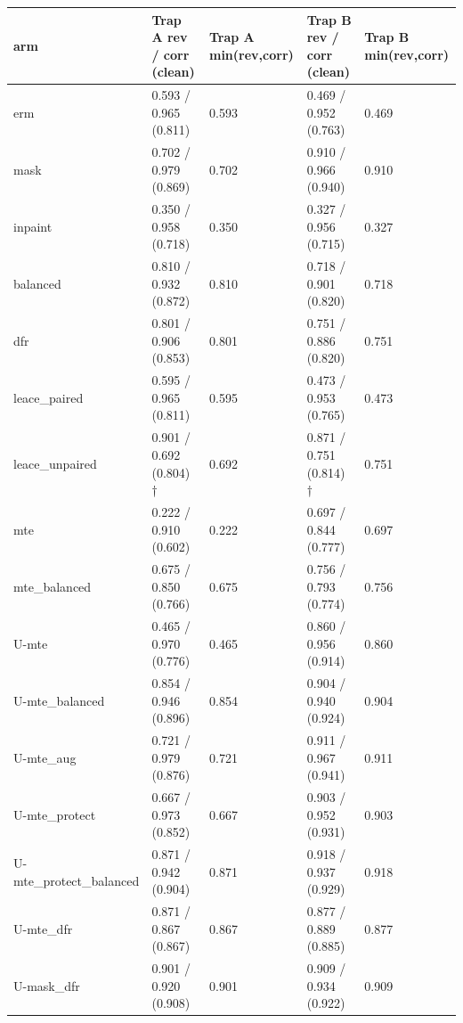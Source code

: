 {{ %
\begin{longtable}[]{@{}lllll@{}}
\toprule\noalign{}
arm & Trap A rev / corr (clean) & Trap A min(rev,corr) & Trap B rev / corr (clean) & Trap B min(rev,corr) \\
\midrule\noalign{}
\endhead
\bottomrule\noalign{}
\endlastfoot
erm & 0.593 / 0.965 (0.811) & 0.593 & 0.469 / 0.952 (0.763) & 0.469 \\
mask & 0.702 / 0.979 (0.869) & 0.702 & 0.910 / 0.966 (0.940) & 0.910 \\
inpaint & 0.350 / 0.958 (0.718) & 0.350 & 0.327 / 0.956 (0.715) & 0.327 \\
balanced & 0.810 / 0.932 (0.872) & 0.810 & 0.718 / 0.901 (0.820) & 0.718 \\
dfr & 0.801 / 0.906 (0.853) & 0.801 & 0.751 / 0.886 (0.820) & 0.751 \\
leace\_paired & 0.595 / 0.965 (0.811) & 0.595 & 0.473 / 0.953 (0.765) & 0.473 \\
leace\_unpaired & 0.901 / 0.692 (0.804) † & 0.692 & 0.871 / 0.751 (0.814) † & 0.751 \\
mte & 0.222 / 0.910 (0.602) & 0.222 & 0.697 / 0.844 (0.777) & 0.697 \\
mte\_balanced & 0.675 / 0.850 (0.766) & 0.675 & 0.756 / 0.793 (0.774) & 0.756 \\
U-mte & 0.465 / 0.970 (0.776) & 0.465 & 0.860 / 0.956 (0.914) & 0.860 \\
U-mte\_balanced & 0.854 / 0.946 (0.896) & 0.854 & 0.904 / 0.940 (0.924) & 0.904 \\
U-mte\_aug & 0.721 / 0.979 (0.876) & 0.721 & 0.911 / 0.967 (0.941) & 0.911 \\
U-mte\_protect & 0.667 / 0.973 (0.852) & 0.667 & 0.903 / 0.952 (0.931) & 0.903 \\
U-mte\_protect\_balanced & 0.871 / 0.942 (0.904) & 0.871 & 0.918 / 0.937 (0.929) & 0.918 \\
U-mte\_dfr & 0.871 / 0.867 (0.867) & 0.867 & 0.877 / 0.889 (0.885) & 0.877 \\
U-mask\_dfr & 0.901 / 0.920 (0.908) & 0.901 & 0.909 / 0.934 (0.922) & 0.909 \\
\end{longtable}
}

}
